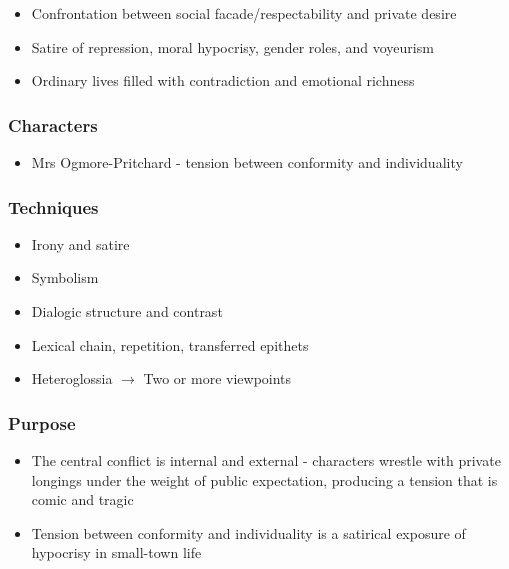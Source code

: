 			\begin{itemize}
				\item Confrontation between social facade/respectability and private desire
				\item Satire of repression, moral hypocrisy, gender roles, and voyeurism
				\item Ordinary lives filled with contradiction and emotional richness
			\end{itemize}

		\subsubsection{Characters}
		
			\begin{itemize}
				\item Mrs Ogmore-Pritchard - tension between conformity and individuality
			\end{itemize}

		\subsubsection{Techniques}
		
			\begin{itemize}
				\item Irony and satire
				\item Symbolism
				\item Dialogic structure and contrast
				\item Lexical chain, repetition, transferred epithets
				\item Heteroglossia $\rightarrow$ Two or more viewpoints
			\end{itemize}

		\subsubsection{Purpose}

			\begin{itemize}
				\item The central conflict is internal and external - characters wrestle with private longings under the weight of public expectation, producing a tension that is comic and tragic
				\item Tension between conformity and individuality is a satirical exposure of hypocrisy in small-town life
			\end{itemize}


